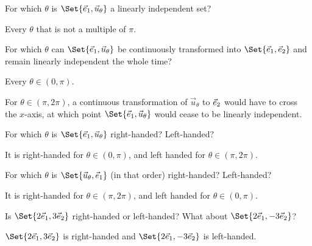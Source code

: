 	\begin{parts}
		\item For which $\theta$ is $\Set{\xhat,\vec u_{\theta}}$ a linearly independent set?
			\begin{solution}[inline]
				Every $\theta$ that is not a multiple of $\pi$.
			\end{solution}
		\item For which $\theta$ can $\Set{\xhat,\vec u_{\theta}}$ be continuously
			transformed into $\Set{\xhat,\yhat}$ and remain linearly independent the
			whole time?
			\begin{solution}
				Every $\theta \in (0, \pi)$.

				For $\theta\in(\pi,2\pi)$, a continuous transformation of
				$\vec u_\theta$	to ${\vec e_2}$ would have to cross the $x$-axis,
				at which point $\Set{\xhat,\vec u_\theta}$ would cease to be
				linearly independent.
			\end{solution}
		\item For which $\theta$ is $\Set{\xhat,\vec u_{\theta}}$ right-handed?
			Left-handed?
			\begin{solution}
				It is right-handed for $\theta\in(0, \pi)$, and left handed for
				$\theta\in(\pi,2\pi)$.
			\end{solution}
		\item For which $\theta$ is $\Set{\vec u_{\theta},\xhat}$ (in that order)
			right-handed? Left-handed?
			\begin{solution}
				It is right-handed for $\theta\in(\pi,2\pi)$, and left handed
				for $\theta\in(0,\pi)$.
			\end{solution}
		\item Is $\Set{2\xhat, 3\yhat}$ right-handed or left-handed? What about $\Set{2\xhat, -3\yhat}$?
			\begin{solution}
				$\Set{2\xhat, 3\yhat}$ is right-handed and $\Set{2\xhat, -3\yhat}$ is left-handed.
			\end{solution}
	\end{parts}


